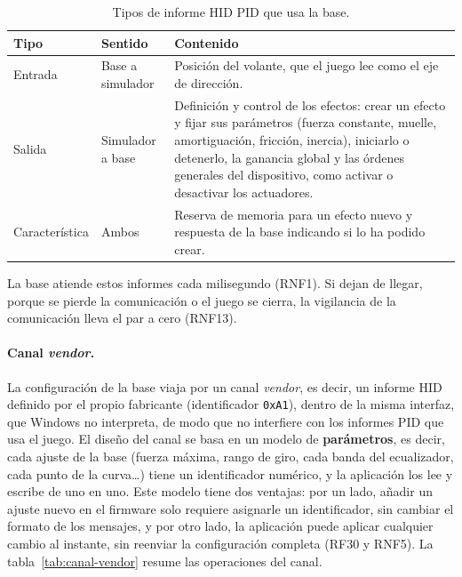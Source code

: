 \begin{table}[H]
	\centering
	\caption{Tipos de informe HID PID que usa la base.}
	\label{tab:informes-pid}
	\small
	\begin{tabularx}{\textwidth}{@{}>{\raggedright\arraybackslash}p{2.4cm}>{\raggedright\arraybackslash}p{2.6cm}X@{}}
		\toprule
		\textbf{Tipo} & \textbf{Sentido} & \textbf{Contenido} \\
		\midrule
		Entrada & Base a simulador & Posición del volante, que el juego lee como el eje de dirección. \\
		Salida & Simulador a base & Definición y control de los efectos: crear un efecto y fijar sus parámetros (fuerza constante, muelle, amortiguación, fricción, inercia), iniciarlo o detenerlo, la ganancia global y las órdenes generales del dispositivo, como activar o desactivar los actuadores. \\
		Característica & Ambos & Reserva de memoria para un efecto nuevo y respuesta de la base indicando si lo ha podido crear. \\
		\bottomrule
	\end{tabularx}
\end{table}

La base atiende estos informes cada milisegundo (RNF1). Si dejan de llegar, porque se pierde la comunicación o el juego se cierra, la vigilancia de la comunicación lleva el par a cero (RNF13).

\paragraph{Canal \textit{vendor}.}
La configuración de la base viaja por un canal \textit{vendor}, es decir, un informe HID definido por el propio fabricante (identificador \texttt{0xA1}), dentro de la misma interfaz, que Windows no interpreta, de modo que no interfiere con los informes PID que usa el juego. El diseño del canal se basa en un modelo de \textbf{parámetros}, es decir, cada ajuste de la base (fuerza máxima, rango de giro, cada banda del ecualizador, cada punto de la curva\ldots) tiene un identificador numérico, y la aplicación los lee y escribe de uno en uno. Este modelo tiene dos ventajas: por un lado, añadir un ajuste nuevo en el firmware solo requiere asignarle un identificador, sin cambiar el formato de los mensajes, y por otro lado, la aplicación puede aplicar cualquier cambio al instante, sin reenviar la configuración completa (RF30 y RNF5). La tabla~\ref{tab:canal-vendor} resume las operaciones del canal.

